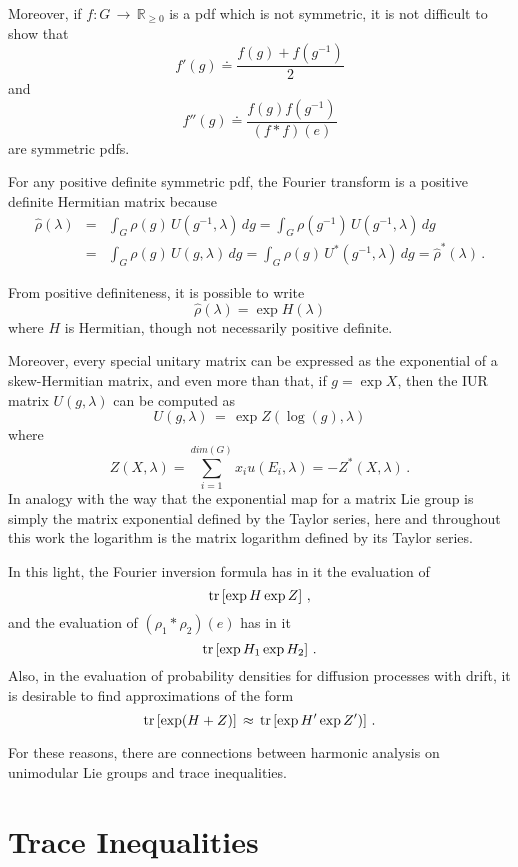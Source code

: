 \documentclass{svmult}
\newcommand{\IR}{\mathbb{R}}
\begin{document}
Moreover, if $f:G\,\rightarrow\,\IR_{\geq 0}$ is a pdf which is not symmetric, it is not difficult to show that
$$ f'(g) \doteq \frac{f(g) + f(g^{-1})}{2} $$
and
$$ f''(g) \doteq \frac{f(g) f(g^{-1})}{(f*f)(e)} $$
are symmetric pdfs.

For any positive definite symmetric pdf, the Fourier transform is
a positive definite Hermitian matrix because
\begin{eqnarray*}
\hat{\rho}(\lambda) &=& \int_G \rho(g)\, U(g^{-1},\lambda)\, dg =
\int_G \rho(g^{-1})\, U(g^{-1},\lambda)\, dg \\
&=& \int_G \rho(g)\, U(g,\lambda)\, dg =
\int_G \rho(g)\, U^*(g^{-1},\lambda)\, dg = \hat{\rho}^*(\lambda)\,.
\end{eqnarray*}

From positive definiteness, it is possible to write
$$ \hat{\rho}(\lambda) = \exp H(\lambda) $$
where $H$ is Hermitian, though not necessarily positive definite.

Moreover, every special unitary matrix can be expressed as the exponential of
a skew-Hermitian matrix, and even more than that, if $g = \exp X$, then the IUR matrix $U(g,\lambda)$ can be computed as
$$ U(g,\lambda)\,=\,\exp Z(\log(g),\lambda) $$
where
$$ Z(X,\lambda) = \sum_{i=1}^{dim(G)} x_i u(E_i,\lambda) = - Z^*(X,\lambda)\,. $$
In analogy with the way that the exponential map for a matrix Lie group is simply the
matrix exponential defined by the Taylor series, here and throughout this work 
the logarithm is the matrix logarithm defined by its Taylor series.

In this light, the Fourier inversion formula has in it the evaluation of
$$ {\rm tr}\left[
\exp H \exp Z
\right]\,, $$
and the evaluation of $(\rho_1*\rho_2)(e)$ has in it
$$ {\rm tr}\left[
\exp H_1 \exp H_2
\right]\,. $$
Also, in the evaluation of probability densities for diffusion processes with
drift, it is desirable to find approximations of the form
$$ {\rm tr}\left[
\exp (H + Z)
\right]\,\approx\,{\rm tr}\left[
\exp H' \exp Z')
\right]\,. $$

For these reasons, there are connections between harmonic analysis on
unimodular Lie groups and trace inequalities.

\section{Trace Inequalities} \label{tracesec}

\end{document}
